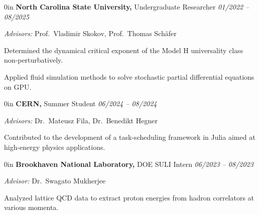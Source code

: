 \begin{adjustwidth}{\spacing}{0in}
    \textbf{North Carolina State University,} Undergraduate Researcher
    \hfill \textsl{01/2022 -- 08/2025}

    \textit{Advisors:} Prof.~Vladimir Skokov, Prof.~Thomas Sch\"afer
    \begin{adjustwidth}{\bullet}{\rightedge}
        Determined the dynamical critical exponent of the Model H universality
        class non-perturbatively.

        Applied fluid simulation methods to solve stochastic partial differential
        equations on GPU.
    \end{adjustwidth}
\end{adjustwidth}

\begin{adjustwidth}{\spacing}{0in}
    \textbf{CERN,} Summer Student
    \hfill \textsl{06/2024 -- 08/2024}

    \textit{Advisors:} Dr.~Mateusz Fila, Dr.~Benedikt Hegner
    \begin{adjustwidth}{\bullet}{\rightedge}
        Contributed to the development of a task-scheduling framework in Julia
        aimed at high-energy physics applications.
    \end{adjustwidth}
\end{adjustwidth}

\begin{adjustwidth}{\spacing}{0in}
    \textbf{Brookhaven National Laboratory,} DOE SULI Intern
    \hfill \textsl{06/2023 -- 08/2023}

    \textit{Advisor:} Dr.~Swagato Mukherjee
    \begin{adjustwidth}{\bullet}{\rightedge}
        Analyzed lattice QCD data to extract proton energies from hadron
        correlators at various momenta.
    \end{adjustwidth}
\end{adjustwidth}

